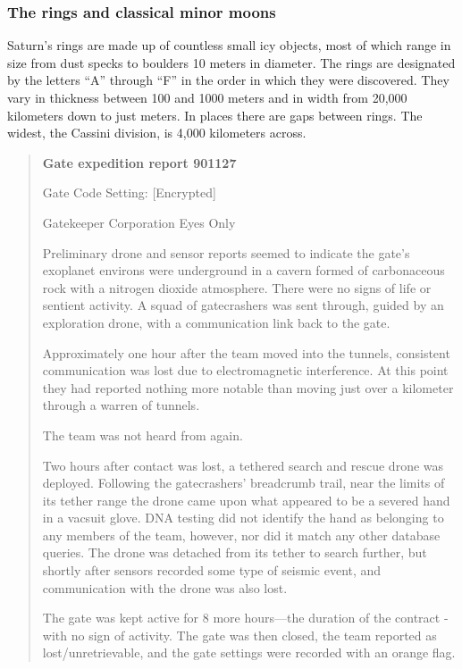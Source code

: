 \subsubsection{The rings and classical minor moons} \label{sec:rings-class-minor} 

Saturn's rings are made up of countless small icy objects, most of which range in size from dust specks to boulders 10 meters in diameter. The rings are designated by the letters “A” through “F” in the order in which they were discovered. They vary in thickness between 100 and 1000 meters and in width from 20,000 kilometers down to just meters. In places there are gaps between rings. The widest, the Cassini division, is 4,000 kilometers across. 





\begin{quotation} \textbf{Gate expedition report 901127} 

Gate Code Setting: [Encrypted] 

Gatekeeper Corporation Eyes Only 

Preliminary drone and sensor reports seemed to indicate the gate’s exoplanet environs were underground in a cavern formed of carbonaceous rock with a nitrogen dioxide atmosphere. There were no signs of life or sentient activity. A squad of gatecrashers was sent through, guided by an exploration drone, with a communication link back to the gate. 

Approximately one hour after the team moved into the tunnels, consistent communication was lost due to electromagnetic interference. At this point they had reported nothing more notable than moving just over a kilometer through a warren of tunnels. 

The team was not heard from again. 

Two hours after contact was lost, a tethered search and rescue drone was deployed. Following the gatecrashers’ breadcrumb trail, near the limits of its tether range the drone came upon what appeared to be a severed hand in a vacsuit glove. DNA testing did not identify the hand as belonging to any members of the team, however, nor did it match any other database queries. The drone was detached from its tether to search further, but shortly after sensors recorded some type of seismic event, and communication with the drone was also lost. 

The gate was kept active for 8 more hours—the duration of the contract - with no sign of activity. The gate was then closed, the team reported as lost/unretrievable, and the gate settings were recorded with an orange flag. \end{quotation} 





